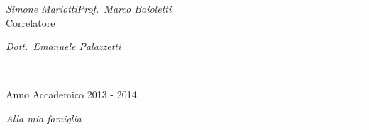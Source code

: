 \documentclass[a4paper,12pt]{report}
\def\laureando{Simone Mariotti}       %
\def\annoaccademico{2013 - 2014}    %
\def\dedica{Alla mia famiglia}      %
\newlength\corpo
\begin{document}
\begin{titlepage}
\hspace{0.0cm}\emph{\laureando}\hfill\emph{Prof.~Marco Baioletti}\\

\hspace*{9.5cm}Correlatore\par
\hspace*{3.0cm}\hfill\emph{Dott.~Emanuele Palazzetti}\\
\begin{center}
\vspace*{-3mm}

\rule{40mm}{0.01mm}\\

Anno Accademico \annoaccademico

\end{center}

\end{titlepage}

\newpage
\thispagestyle{empty}
\vspace*{2.5cm}
\begin{flushright}
\begin{Large}\emph{\dedica}\end{Large}
\end{flushright}
\frenchspacing
%

\thispagestyle{empty}
\tableofcontents



\fancyhf{}
\pagestyle{fancy}


\newpage
{}








\end{document}
